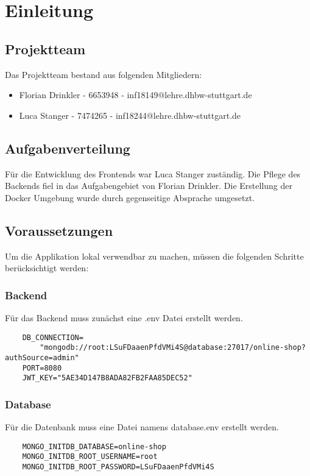 
\chapter{Einleitung}\label{ch:einleitung}
\section{Projektteam}\label{sec:projektteam}
Das Projektteam bestand aus folgenden Mitgliedern:
\begin{itemize}
	\item Florian Drinkler - 6653948 - inf18149@lehre.dhbw-stuttgart.de
	\item Luca Stanger - 7474265 - inf18244@lehre.dhbw-stuttgart.de
\end{itemize}
\section{Aufgabenverteilung}\label{sec:aufgabenverteilung}
Für die Entwicklung des Frontends war Luca Stanger zuständig. Die Pflege des Backends fiel in das Aufgabengebiet von Florian Drinkler. Die Erstellung der Docker Umgebung wurde durch gegenseitige Absprache umgesetzt.
\newpage
\section{Voraussetzungen}
Um die Applikation lokal verwendbar zu machen, müssen die folgenden Schritte berücksichtigt werden:

\subsection*{Backend}
Für das Backend muss zunächst eine .env Datei erstellt werden. 

\begin{verbatim}
	DB_CONNECTION=
		"mongodb://root:LSuFDaaenPfdVMi4S@database:27017/online-shop?authSource=admin"
	PORT=8080
	JWT_KEY="5AE34D147B8ADA82FB2FAA85DEC52"
\end{verbatim}

\subsection*{Database}
Für die Datenbank muss eine Datei namens database.env erstellt werden.
\begin{verbatim}
	MONGO_INITDB_DATABASE=online-shop
	MONGO_INITDB_ROOT_USERNAME=root
	MONGO_INITDB_ROOT_PASSWORD=LSuFDaaenPfdVMi4S
\end{verbatim}

